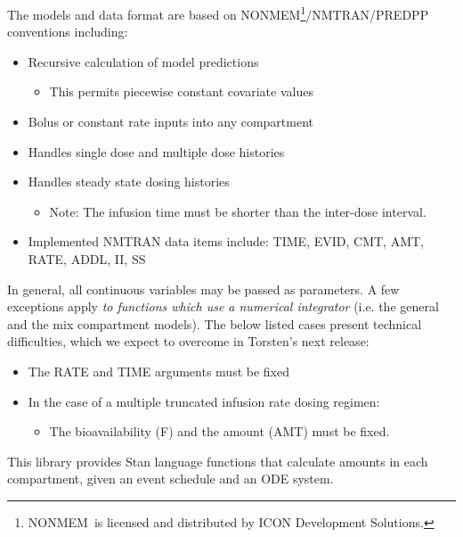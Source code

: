 \documentclass[11pt]{amsart}
\begin{document}
The models and data format are based on NONMEM\textregistered\footnote{NONMEM\textregistered\ is licensed and distributed by ICON Development Solutions.}/NMTRAN/PREDPP conventions including:
\begin{itemize}
  \item Recursive calculation of model predictions
  \begin{itemize}
    \item This permits piecewise constant covariate values
  \end{itemize}
  \item Bolus or constant rate inputs into any compartment
  \item Handles single dose and multiple dose histories
  \item Handles steady state dosing histories
  \begin{itemize}
      \item Note: The infusion time must be shorter than the inter-dose interval.
  \end{itemize}
  \item Implemented NMTRAN data items include: TIME, EVID, CMT, AMT, RATE, ADDL, II, SS
\end{itemize}

In general, all continuous variables may be passed as parameters. A few exceptions apply \textit{to functions which use a numerical integrator} (i.e. the general and the mix compartment models). The below listed cases present technical difficulties, which we expect to overcome in Torsten's next release:
\begin{itemize}
  \item The RATE and TIME arguments must be fixed
  \item In the case of a multiple truncated infusion rate dosing regimen:
  \begin{itemize}
    \item The bioavailability (F) and the amount (AMT) must be fixed.
  \end{itemize}
\end{itemize}   

This library provides Stan language functions that calculate amounts in each compartment, given an event schedule and an ODE system.
    
\end{document}
